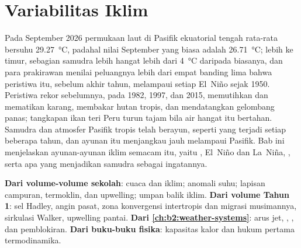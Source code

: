 \chapter{Variabilitas Iklim}\label{ch:b2:climate-variability}

Pada September 2026 permukaan laut di Pasifik ekuatorial tengah rata-rata bersuhu \qty{29.27}{\celsius},
padahal nilai September yang biasa adalah \qty{26.71}{\celsius}; lebih ke timur, sebagian samudra
lebih hangat lebih dari \qty{4}{\celsius} daripada biasanya, dan para prakirawan menilai peluangnya
lebih dari empat banding lima bahwa peristiwa itu, sebelum akhir tahun, melampaui setiap El~Niño sejak 1950. Peristiwa
rekor sebelumnya, pada 1982, 1997, dan 2015, memutihkan dan mematikan karang, membakar hutan tropis,
dan mendatangkan gelombang panas; tangkapan ikan teri Peru turun tajam bila air hangat itu bertahan. Samudra
dan atmosfer Pasifik tropis telah berayun, seperti yang terjadi setiap beberapa tahun, dan
ayunan itu menjangkau jauh melampaui Pasifik. Bab
ini menjelaskan ayunan-ayunan iklim semacam itu, yaitu , El~Niño dan La~Niña, , serta apa yang menjadikan samudra sebagai ingatannya.

\begin{recall}
\textbf{Dari volume-volume sekolah}: cuaca dan iklim; anomali suhu; lapisan campuran,
termoklin, dan upwelling; umpan balik iklim. \textbf{Dari volume Tahun 1}: sel
Hadley, angin pasat, zona konvergensi intertropis dan migrasi musimannya, sirkulasi
Walker, upwelling pantai. \textbf{Dari \cref{ch:b2:weather-systems}}: arus jet,
, , dan pemblokiran. \textbf{Dari buku-buku fisika}: kapasitas kalor
dan hukum pertama termodinamika.
\end{recall}


